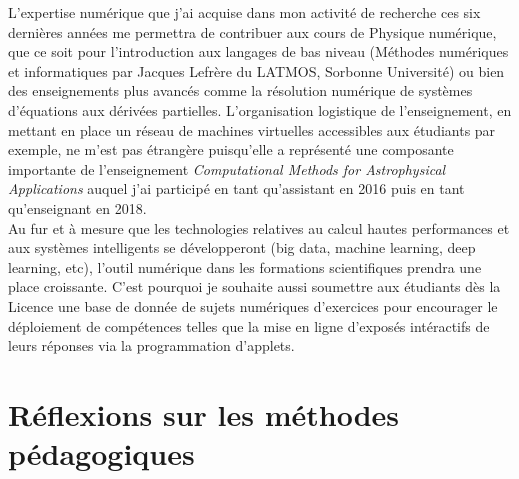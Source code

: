 \documentclass[12pt,onecolumn]{article}
\begin{document}
L'expertise numérique que j'ai acquise dans mon activité de recherche ces six dernières années me permettra de contribuer aux cours de Physique numérique, que ce soit pour l'introduction aux langages de bas niveau (Méthodes numériques et informatiques par Jacques Lefrère du LATMOS, Sorbonne Université) ou bien des enseignements plus avancés comme la résolution numérique de systèmes d'équations aux dérivées partielles. L'organisation logistique de l'enseignement, en mettant en place un r\'eseau de machines virtuelles accessibles aux \'etudiants par exemple, ne m'est pas étrangère puisqu'elle a représenté une composante importante de l'enseignement \textit{Computational Methods for Astrophysical Applications} auquel j'ai participé en tant qu'assistant en 2016 puis en tant qu'enseignant en 2018. \\

Au fur et à mesure que les technologies relatives au calcul hautes performances et aux systèmes intelligents se développeront (big data, machine learning, deep learning, etc), l'outil numérique dans les formations scientifiques prendra une place croissante. C'est pourquoi je souhaite aussi soumettre aux \'etudiants d\`{e}s la Licence une base de donn\'ee de sujets num\'eriques d'exercices pour encourager le d\'eploiement de comp\'etences telles que la mise en ligne d'expos\'es int\'eractifs de leurs r\'eponses via la programmation d'applets.


\section*{Réflexions sur les méthodes pédagogiques}
\end{document}
